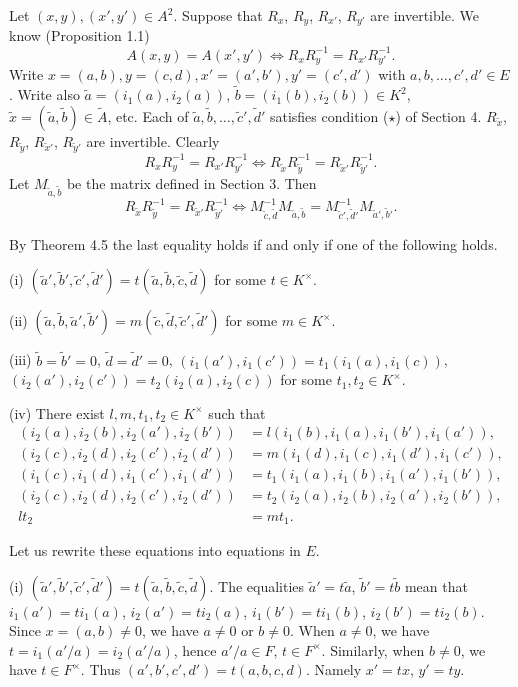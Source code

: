 \documentclass{article}
\begin{document}
Let $(x,y), (x',y')\in A^2$.
Suppose that $R_x$, $R_y$, $R_{x'}$, $R_{y'}$ are invertible.
We know (Proposition 1.1)
$$
A(x,y)=A(x',y')\iff R_xR_y^{-1}=R_{x'}R_{y'}^{-1}.
$$
Write $x=(a,b), y=(c,d), x'=(a',b'),y'=(c',d')$ with $a,b,\dots,c',d'\in E$.
Write also
$\tilde a=(i_1(a),i_2(a))$, $\tilde b=(i_1(b), i_2(b)) \in K^2$, 
$\tilde x=(\tilde a,\tilde b)\in \tilde A$, etc.
Each of $\tilde a, \tilde b, \dots,\tilde c',\tilde d'$ satisfies condition ($\star$) of Section 4.
$R_{\tilde x}$, $R_{\tilde y}$, $R_{\tilde x'}$, $R_{\tilde y'}$ are invertible.
Clearly
$$
R_xR_y^{-1}=R_{x'}R_{y'}^{-1}
\iff
R_{\tilde x} R_{\tilde y}^{-1}=R_{\tilde x'}R_{\tilde y'}^{-1}.
$$
Let $M_{\tilde a, \tilde b}$ be the matrix defined in Section 3.
Then
$$
R_{\tilde x} R_{\tilde y}^{-1}=R_{\tilde x'}R_{\tilde y'}^{-1}
\iff
M_{\tilde c, \tilde d}^{-1}M_{\tilde a, \tilde b}=
 M_{\tilde c', \tilde d'}^{-1}M_{\tilde a',\tilde b'}.
$$

By Theorem 4.5 the last equality holds if and only if one of the following  holds.

(i) $(\tilde a', \tilde b', \tilde c', \tilde d')=t(\tilde a, \tilde b, \tilde c, \tilde d)$ for some $t\in K^{\times}$.

(ii) $(\tilde a, \tilde b,\tilde a', \tilde b')=m(\tilde c, \tilde d, \tilde c', \tilde d')$ for some $m\in K^{\times}$.

(iii) $\tilde b=\tilde b'=0$, $\tilde d=\tilde d'=0$, 
$(i_1(a'), i_1(c'))=t_1(i_1(a), i_1(c))$, $(i_2(a'), i_2(c'))=t_2(i_2(a), i_2(c))$ for some $t_1,t_2\in K^{\times}$.

(iv)
 There exist $l,m,t_1,t_2\in K^{\times}$ such that
\begin{align*}
(i_2(a),i_2(b), i_2(a'),i_2(b'))&=l(i_1(b),i_1(a),i_1(b'),i_1(a')), \\
(i_2(c),i_2(d), i_2(c'),i_2(d'))&=m(i_1(d),i_1(c),i_1(d'),i_1(c')), \\
(i_1(c),i_1(d),i_1(c'),i_1(d'))&=t_1(i_1(a),i_1(b),i_1(a'),i_1(b')), \\
(i_2(c),i_2(d),i_2(c'),i_2(d'))&=t_2(i_2(a),i_2(b),i_2(a'),i_2(b')), \\
lt_2&=mt_1.
\end{align*}

Let us rewrite these equations into equations in $E$.

(i) 
$(\tilde a', \tilde b', \tilde c', \tilde d')=t(\tilde a, \tilde b, \tilde c, \tilde d)$. The equalities
$\tilde a'=t\tilde a$, $\tilde b'=t \tilde b$ mean that
$i_1(a')=t i_1(a)$, $i_2(a')=t i_2(a)$,  $i_1(b')=t i_1(b)$,  $i_2(b')=t i_2(b)$.
Since $x=(a,b)\ne 0$, we have $a\ne 0$ or $b\ne 0$.
When $a\ne 0$, we have
$t=i_1(a'/a)=i_2(a'/a)$,
hence $a'/a\in F$, $t\in F^{\times}$.
Similarly, when $b\ne 0$, we have $t\in F^{\times}$.
Thus
$(a',b',c',d')=t(a,b,c,d)$.
Namely $x'=tx$, $y'=ty$.
\end{document}

